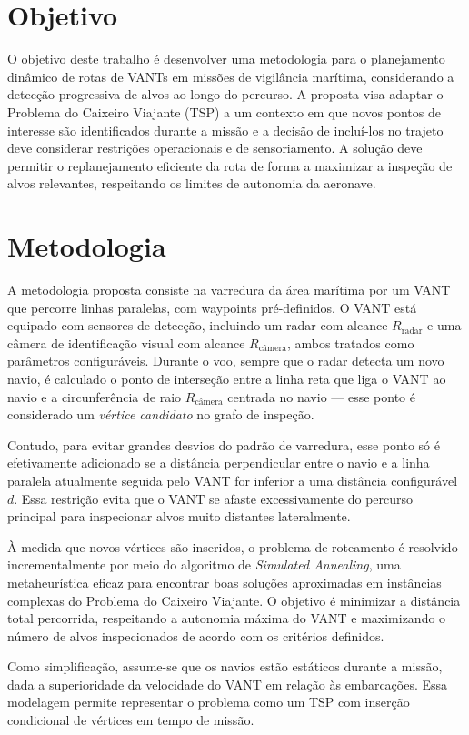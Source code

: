 \documentclass[12 pt]{article}
\begin{document}
\section{Objetivo}
O objetivo deste trabalho é desenvolver uma metodologia para o planejamento dinâmico de rotas de VANTs em missões de vigilância marítima, considerando a detecção progressiva de alvos ao longo do percurso. A proposta visa adaptar o Problema do Caixeiro Viajante (TSP) a um contexto em que novos pontos de interesse são identificados durante a missão e a decisão de incluí-los no trajeto deve considerar restrições operacionais e de sensoriamento. A solução deve permitir o replanejamento eficiente da rota de forma a maximizar a inspeção de alvos relevantes, respeitando os limites de autonomia da aeronave.

\section{Metodologia}
A metodologia proposta consiste na varredura da área marítima por um VANT que percorre linhas paralelas, com waypoints pré-definidos. O VANT está equipado com sensores de detecção, incluindo um radar com alcance \( R_{\text{radar}} \) e uma câmera de identificação visual com alcance \( R_{\text{câmera}} \), ambos tratados como parâmetros configuráveis. Durante o voo, sempre que o radar detecta um novo navio, é calculado o ponto de interseção entre a linha reta que liga o VANT ao navio e a circunferência de raio \( R_{\text{câmera}} \) centrada no navio — esse ponto é considerado um \textit{vértice candidato} no grafo de inspeção.

Contudo, para evitar grandes desvios do padrão de varredura, esse ponto só é efetivamente adicionado se a distância perpendicular entre o navio e a linha paralela atualmente seguida pelo VANT for inferior a uma distância configurável \(d\). Essa restrição evita que o VANT se afaste excessivamente do percurso principal para inspecionar alvos muito distantes lateralmente.

À medida que novos vértices são inseridos, o problema de roteamento é resolvido incrementalmente por meio do algoritmo de \textit{Simulated Annealing}, uma metaheurística eficaz para encontrar boas soluções aproximadas em instâncias complexas do Problema do Caixeiro Viajante. O objetivo é minimizar a distância total percorrida, respeitando a autonomia máxima do VANT e maximizando o número de alvos inspecionados de acordo com os critérios definidos.

Como simplificação, assume-se que os navios estão estáticos durante a missão, dada a superioridade da velocidade do VANT em relação às embarcações. Essa modelagem permite representar o problema como um TSP com inserção condicional de vértices em tempo de missão.
\end{document}
